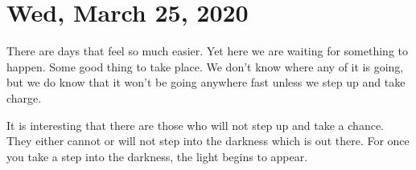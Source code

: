 \section{Wed, March 25, 2020}
There are days that feel so much easier. Yet here we are waiting for something
to happen. Some good thing to take place. We don't know where any of it is 
going, but we do know that it won't be going anywhere fast unless we step up
and take charge.

It is interesting that there are those who will not step up and take a chance. 
They either cannot or will not step into the darkness which is out there. For
once you take a step into the darkness, the light begins to appear.